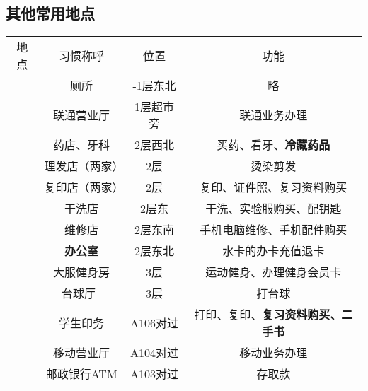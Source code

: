 \subsection[其他常用地点]{其他常用地点}
\begin{table}[!ht]
    \vspace{-1em}
    \centering
    \begin{tabular}{|c|c|c|c|}
        \Xhline{1.2pt}
        地点                    & 习惯称呼               & 位置     & 功能                        \\
        \Xhline{1.2pt}
        \multirow{9}{*}{大服}   & 厕所                 & -1层东北  & 略                         \\
        \cline{2-4}
                              & 联通营业厅              & 1层超市旁  & 联通业务办理                    \\
        \cline{2-4}
                              & 药店、牙科              & 2层西北   & 买药、看牙、\textbf{冷藏药品}       \\
        \cline{2-4}
                              & 理发店（两家）            & 2层     & 烫染剪发                      \\
        \cline{2-4}
                              & 复印店（两家）            & 2层     & 复印、证件照、复习资料购买             \\
        \cline{2-4}
                              & 干洗店                & 2层东    & 干洗、实验服购买、配钥匙              \\
        \cline{2-4}
                              & 维修店                & 2层东南   & 手机电脑维修、手机配件购买             \\
        \cline{2-4}
                              & \textbf{办公室}       & 2层东北   & 水卡的办卡充值退卡                 \\
        \cline{2-4}
                              & 大服健身房\footnotemark & 3层     & 运动健身、办理健身会员卡              \\
        \cline{2-4}
                              & 台球厅\               & 3层     & 打台球                       \\
        \Xhline{1.2pt}
        \multirow{3}{*}{中和广场} & 学生印务               & A106对过 & 打印、复印、\textbf{复习资料购买、二手书} \\
        \cline{2-4}
                              & 移动营业厅              & A104对过 & 移动业务办理                    \\
        \cline{2-4}
                              & 邮政银行ATM            & A103对过 & 存取款                       \\

\end{tabular}
\end{table}
